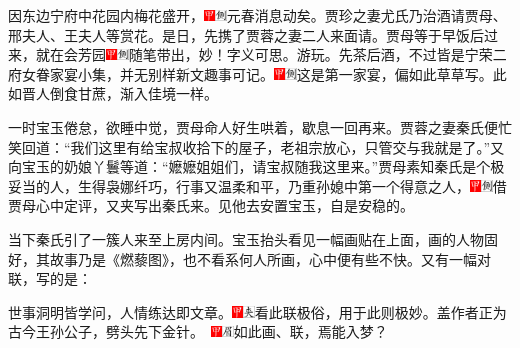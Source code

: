 因东边宁府中花园内梅花盛开，{\includegraphics[width=3mm]{../Images/00002}\includegraphics[width=3mm]{../Images/00011}\footnotesize \kaishu 元春消息动矣。}贾珍之妻尤氏乃治酒请贾母、邢夫人、王夫人等赏花。是日，先携了贾蓉之妻二人来面请。贾母等于早饭后过来，就在会芳园{\includegraphics[width=3mm]{../Images/00002}\includegraphics[width=3mm]{../Images/00011}\footnotesize \kaishu 随笔带出，妙！字义可思。}游玩。先茶后酒，不过皆是宁荣二府女眷家宴小集，并无别样新文趣事可记。{\includegraphics[width=3mm]{../Images/00002}\includegraphics[width=3mm]{../Images/00011}\footnotesize \kaishu 这是第一家宴，偏如此草草写。此如晋人倒食甘蔗，渐入佳境一样。}

一时宝玉倦怠，欲睡中觉，贾母命人好生哄着，歇息一回再来。贾蓉之妻秦氏便忙笑回道：“我们这里有给宝叔收拾下的屋子，老祖宗放心，只管交与我就是了。”又向宝玉的奶娘丫鬟等道：“嬷嬷姐姐们，请宝叔随我这里来。”贾母素知秦氏是个极妥当的人，生得袅娜纤巧，行事又温柔和平，乃重孙媳中第一个得意之人，{\includegraphics[width=3mm]{../Images/00002}\includegraphics[width=3mm]{../Images/00011}\footnotesize \kaishu 借贾母心中定评，又夹写出秦氏来。}见他去安置宝玉，自是安稳的。

当下秦氏引了一簇人来至上房内间。宝玉抬头看见一幅画贴在上面，画的人物固好，其故事乃是《燃藜图》，也不看系何人所画，心中便有些不快。又有一幅对联，写的是：

世事洞明皆学问，人情练达即文章。{\includegraphics[width=3mm]{../Images/00002}\includegraphics[width=3mm]{../Images/00012}\footnotesize \kaishu 看此联极俗，用于此则极妙。盖作者正为古今王孙公子，劈头先下金针。　\includegraphics[width=3mm]{../Images/00002}\includegraphics[width=3mm]{../Images/00010}\footnotesize \kaishu 如此画、联，焉能入梦？}

